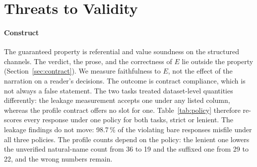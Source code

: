 \documentclass[10pt,twocolumn]{article}
\begin{document}
\section{Threats to Validity}\label{sec:threats}

\paragraph{Construct}
The guaranteed property is referential and value soundness on the structured
channels. The verdict, the prose, and the correctness of $E$ lie outside the
property (Section~\ref{sec:contract}). We measure faithfulness to $E$, not the
effect of the narration on a reader's decisions. The outcome is contract
compliance, which is not always a false statement. The two tasks treated
dataset-level quantities differently: the leakage measurement accepts one
under any listed column, whereas the profile contract offers no slot for one.
Table~\ref{tab:policy} therefore re-scores every response under one policy
for both tasks, strict or lenient. The leakage findings do not move: 98.7\,\%
of the violating bare responses misfile under all three policies. The profile
counts depend on the policy: the lenient one lowers the unverified natural-name
count from 36 to 19 and the suffixed one from 29 to 22, and the wrong numbers
remain.
\end{document}

